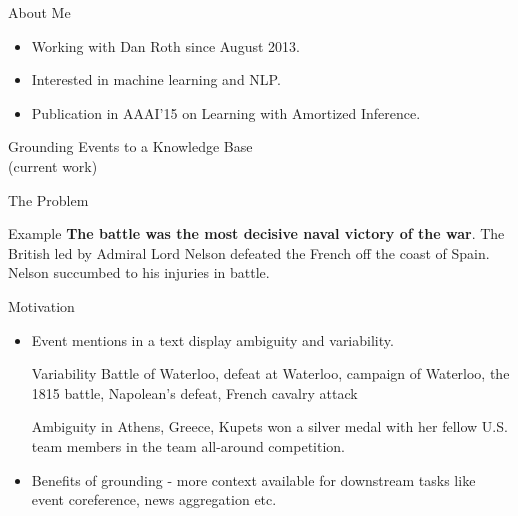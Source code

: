 \begin{frame}{About Me}
  \begin{itemize}
  \item Working with Dan Roth since August 2013.
  \item Interested in machine learning and NLP.
  \item Publication in AAAI'15 on Learning with Amortized Inference.
  \end{itemize}
\end{frame}

\begin{frame}
  \begin{center}
    {
      \huge Grounding Events to a Knowledge Base
    } \\
    (current work)
  \end{center}
\end{frame}


\begin{frame}{The Problem}

  \begin{exampleblock}{Example}
      \textbf<2>{The { battle} was the most decisive naval victory of the {war}}. The British led by Admiral Lord Nelson defeated the French off the coast of Spain. Nelson succumbed to his injuries in battle.
      \end{exampleblock}
  \end{frame}
\begin{frame}{Motivation}
  \begin{itemize}[<+->]
  \item Event mentions in a text display ambiguity and variability.
    \begin{exampleblock}{Variability}
      {Battle of Waterloo, defeat at Waterloo, campaign of Waterloo, the 1815 battle, Napolean's defeat, French cavalry attack}
    \end{exampleblock}

    \begin{exampleblock}{Ambiguity}
      { in Athens, Greece, Kupets won a silver medal with her fellow U.S. team members in the team all-around competition.}
    \end{exampleblock}
  \item Benefits of grounding - more context available for downstream tasks like event coreference, news aggregation etc.
  \end{itemize}
\end{frame}

